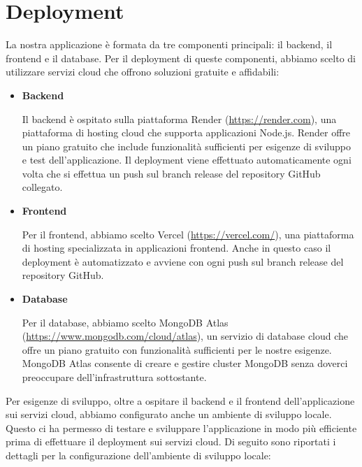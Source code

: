 \chapter{Deployment}
La nostra applicazione è formata da tre componenti principali: il backend, il frontend e il database. 
Per il deployment di queste componenti, abbiamo scelto di utilizzare servizi cloud che offrono soluzioni gratuite e affidabili:
\begin{itemize}
    \item \textbf{Backend}\par
    Il backend è ospitato sulla piattaforma Render (\url{https://render.com}), una piattaforma di hosting cloud che supporta applicazioni Node.js. Render offre un piano gratuito che include funzionalità sufficienti per esigenze di sviluppo e test dell'applicazione. Il deployment viene effettuato automaticamente ogni volta che si effettua un push sul branch release del repository GitHub collegato.

    \item \textbf{Frontend}\par
    Per il frontend, abbiamo scelto Vercel (\url{https://vercel.com/}), una piattaforma di hosting specializzata in applicazioni frontend. Anche in questo caso il deployment è automatizzato e avviene con ogni push sul branch release del repository GitHub.
    
    \item \textbf{Database}\par
    Per il database, abbiamo scelto MongoDB Atlas (\url{https://www.mongodb.com/cloud/atlas}), un servizio di database cloud che offre un piano gratuito con funzionalità sufficienti per le nostre esigenze. MongoDB Atlas consente di creare e gestire cluster MongoDB senza doverci preoccupare dell'infrastruttura sottostante.
\end{itemize}

Per esigenze di sviluppo, oltre a ospitare il backend e il frontend dell'applicazione sui servizi cloud, abbiamo configurato anche un ambiente di sviluppo locale. Questo ci ha permesso di testare e sviluppare l'applicazione in modo più efficiente prima di effettuare il deployment sui servizi cloud. Di seguito sono riportati i dettagli per la configurazione dell'ambiente di sviluppo locale:

